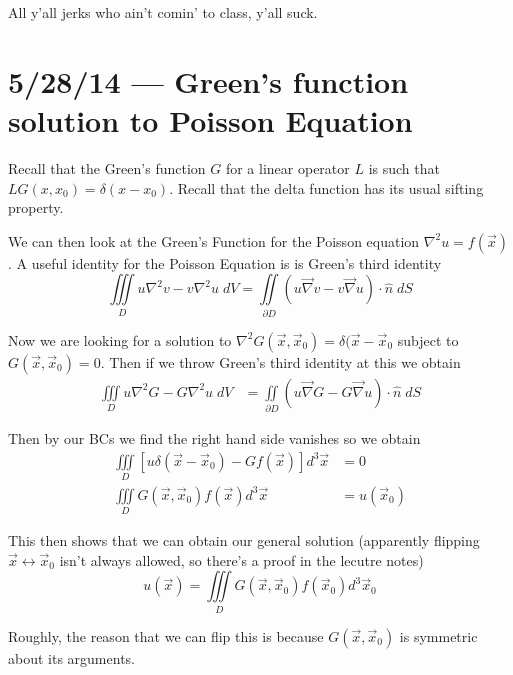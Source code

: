 \documentclass[10pt]{report}
\begin{document}
All y'all jerks who ain't comin' to class, y'all suck.
\chapter{5/28/14 --- Green's function solution to Poisson Equation}

Recall that the Green's function $G$ for a linear operator $L$ is such that $LG(x,x_0) = \delta(x-x_0)$. Recall that the delta function has its usual sifting property.

We can then look at the Green's Function for the Poisson equation $\nabla^2 u = f(\vec{x})$. A useful identity for the Poisson Equation is is Green's third identity
\begin{equation}
    \iiint\limits_D u\nabla^2v - v\nabla^2u\; dV = \iint\limits_{\partial D} \left(u\vec{\nabla}v - v\vec{\nabla}u\right) \cdot \hat{n}\;dS
\end{equation}

Now we are looking for a solution to $\nabla^2 G(\vec{x},\vec{x}_0) = \delta(\vec{x} - \vec{x}_0$ subject to $G(\vec{x}, \vec{x}_0) = 0$. Then if we throw Green's third identity at this we obtain
\begin{align}
    \iiint\limits_D u\nabla^2G - G\nabla^2u\; dV &= \iint\limits_{\partial D} \left(u\vec{\nabla}G - G\vec{\nabla}u\right)\cdot \hat{n}\; dS\label{5.28.Greens}
\end{align}

Then by our BCs we find the right hand side vanishes so we obtain
\begin{align}
    \iiint\limits_D \left[ u \delta(\vec{x} - \vec{x}_0) - Gf(\vec{x}) \right]d^3\vec{x} &= 0\\
    \iiint\limits_D G(\vec{x}, \vec{x}_0) f(\vec{x}) d^3\vec{x} &= u(\vec{x}_0)
\end{align}

This then shows that we can obtain our general solution (apparently flipping $\vec{x} \leftrightarrow \vec{x}_0$ isn't always allowed, so there's a proof in the lecutre notes)
\begin{equation}
    u(\vec{x}) = \iiint\limits_D G(\vec{x}, \vec{x}_0) f(\vec{x}_0) d^3\vec{x}_0
\end{equation}

Roughly, the reason that we can flip this is because $G(\vec{x}, \vec{x}_0)$ is symmetric about its arguments. 
\end{document}
